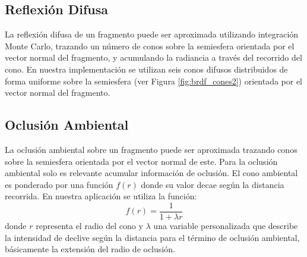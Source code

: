\subsection{Reflexión Difusa}
La reflexión difusa de un fragmento puede ser aproximada utilizando integración Monte Carlo, trazando un número de conos sobre la semiesfera orientada por el vector normal del fragmento, y acumulando la radiancia a través del recorrido del cono. En nuestra implementación se utilizan seis conos difusos distribuidos de forma uniforme sobre la semiesfera (ver Figura \ref{fig:brdf_cones2}) orientada por el vector normal del fragmento.
\subsection{Oclusión Ambiental}
\label{sub:occl_ambt_prop}
La oclusión ambiental sobre un fragmento puede ser aproximada trazando conos sobre la semiesfera orientada por el vector normal de este. Para la oclusión ambiental solo es relevante acumular información de oclusión. El cono ambiental es ponderado por una función $f(r)$ donde su valor decae según la distancia recorrida. En nuestra aplicación se utiliza la función:
\begin{equation}
	f(r) = \frac{1}{1+\lambda r}
\end{equation} donde $r$ representa el radio del cono y $\lambda$ una variable personalizada que describe la intensidad de declive según la distancia para el término de oclusión ambiental, básicamente la extensión del radio de oclusión.

